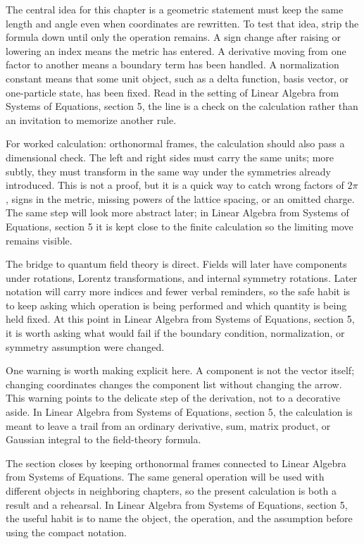 The central idea for this chapter is a geometric statement must keep the same length and angle even when coordinates are rewritten.  To test that idea, strip the formula down until only the operation remains.  A sign change after raising or lowering an index means the metric has entered.  A derivative moving from one factor to another means a boundary term has been handled.  A normalization constant means that some unit object, such as a delta function, basis vector, or one-particle state, has been fixed.  Read in the setting of Linear Algebra from Systems of Equations, section 5, the line is a check on the calculation rather than an invitation to memorize another rule.

For worked calculation: orthonormal frames, the calculation should also pass a dimensional check.  The left and right sides must carry the same units; more subtly, they must transform in the same way under the symmetries already introduced.  This is not a proof, but it is a quick way to catch wrong factors of \(2\pi\), signs in the metric, missing powers of the lattice spacing, or an omitted charge.  The same step will look more abstract later; in Linear Algebra from Systems of Equations, section 5 it is kept close to the finite calculation so the limiting move remains visible.

The bridge to quantum field theory is direct.  Fields will later have components under rotations, Lorentz transformations, and internal symmetry rotations.  Later notation will carry more indices and fewer verbal reminders, so the safe habit is to keep asking which operation is being performed and which quantity is being held fixed.  At this point in Linear Algebra from Systems of Equations, section 5, it is worth asking what would fail if the boundary condition, normalization, or symmetry assumption were changed.

One warning is worth making explicit here.  A component is not the vector itself; changing coordinates changes the component list without changing the arrow.  This warning points to the delicate step of the derivation, not to a decorative aside.  In Linear Algebra from Systems of Equations, section 5, the calculation is meant to leave a trail from an ordinary derivative, sum, matrix product, or Gaussian integral to the field-theory formula.

The section closes by keeping orthonormal frames connected to Linear Algebra from Systems of Equations.  The same general operation will be used with different objects in neighboring chapters, so the present calculation is both a result and a rehearsal.  In Linear Algebra from Systems of Equations, section 5, the useful habit is to name the object, the operation, and the assumption before using the compact notation.




